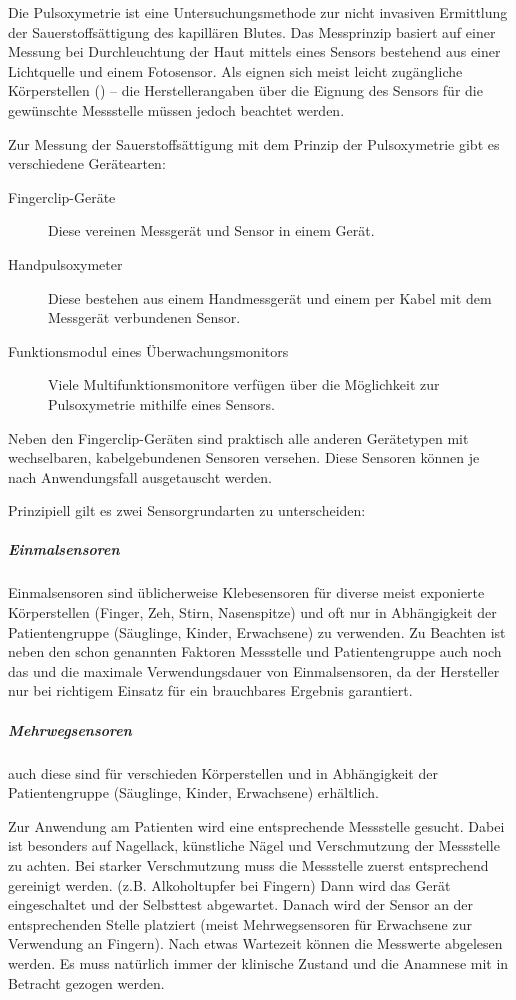 {%
Die Pulsoxymetrie ist eine Untersuchungsmethode zur nicht invasiven Ermittlung
der Sauerstoffsättigung des kapillären Blutes. Das Messprinzip basiert auf einer
Messung  bei Durchleuchtung der
Haut mittels eines Sensors bestehend aus einer Lichtquelle und einem Fotosensor.
Als  eignen sich meist leicht zugängliche Körperstellen
() -- die Herstellerangaben über die Eignung des
Sensors für die gewünschte Messstelle müssen jedoch beachtet werden. 
}{}{}{}{}
{%
Zur Messung der Sauerstoffsättigung mit dem Prinzip der Pulsoxymetrie gibt es
verschiedene Gerätearten:

\begin{description}
  \item[Fingerclip-Geräte] Diese vereinen Messgerät und Sensor in einem
  Gerät.
  \item[Handpulsoxymeter] Diese bestehen aus einem Handmessgerät und einem
  per Kabel mit dem Messgerät verbundenen Sensor.
  \item[Funktionsmodul eines Überwachungsmonitors] Viele
  Multifunktionsmonitore verfügen über die Möglichkeit zur Pulsoxymetrie
  mithilfe eines Sensors.
\end{description}

}{}{}{}{}
{%
Neben den Fingerclip-Geräten sind praktisch alle anderen Gerätetypen mit wechselbaren,
kabelgebundenen Sensoren versehen. Diese Sensoren können je nach Anwendungsfall
ausgetauscht werden.

Prinzipiell gilt es zwei Sensorgrundarten zu unterscheiden:
\subparagraph{Einmalsensoren} Einmalsensoren sind üblicherweise Klebesensoren für diverse meist
exponierte Körperstellen (Finger, Zeh, Stirn, Nasenspitze) und oft nur in Abhängigkeit der
Patientengruppe (Säuglinge, Kinder, Erwachsene) zu verwenden. Zu Beachten ist neben den
schon genannten Faktoren Messstelle und Patientengruppe auch noch das
 und die maximale Verwendungsdauer von Einmalsensoren, da der
Hersteller nur bei richtigem Einsatz für ein brauchbares Ergebnis garantiert.

\subparagraph{Mehrwegsensoren} auch diese sind für verschieden Körperstellen und in Abhängigkeit der
Patientengruppe (Säuglinge, Kinder, Erwachsene) erhältlich.
}{}{}{}{}
{%
Zur Anwendung am Patienten wird eine entsprechende Messstelle gesucht. Dabei ist
besonders auf Nagellack, künstliche Nägel und Verschmutzung der Messstelle zu achten. Bei
starker Verschmutzung muss die Messstelle zuerst entsprechend gereinigt werden. (z.B.
Alkoholtupfer bei Fingern) Dann wird das Gerät eingeschaltet und der Selbsttest abgewartet.
Danach wird der Sensor an der entsprechenden Stelle platziert (meist Mehrwegsensoren für
Erwachsene zur Verwendung an Fingern). Nach etwas Wartezeit können die Messwerte
abgelesen werden. Es muss natürlich immer der klinische Zustand und die Anamnese mit in
Betracht gezogen werden.

}{}{}{}{}

